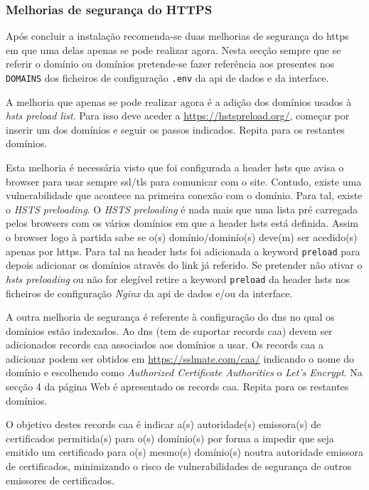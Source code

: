 \subsubsection{Melhorias de segurança do HTTPS}
Após concluir a instalação recomenda-se duas melhorias de segurança do \acrshort{https} em que uma delas apenas se pode realizar agora. Nesta secção sempre que se referir o domínio ou domínios pretende-se fazer referência aos presentes nos \texttt{DOMAINS} dos ficheiros de configuração \texttt{.env} da \acrshort{api} de dados e da interface.

A melhoria que apenas se pode realizar agora é a adição dos domínios usados à \textit{\acrshort{hsts} preload list}. Para isso deve aceder a \url{https://hstspreload.org/}, começar por inserir um dos domínios e seguir os passos indicados. Repita para os restantes domínios. 

Esta melhoria é necessária visto que foi configurada a header \acrshort{hsts} que avisa o browser para usar sempre \acrshort{ssl}/\acrshort{tls} para comunicar com o site. Contudo, existe uma vulnerabilidade que acontece na primeira conexão com o domínio. Para tal, existe o \textit{HSTS preloading}. O \textit{HSTS preloading} é nada mais que uma lista pré carregada pelos browsers com os vários domínios em que a header \acrshort{hsts} está definida. Assim o browser logo à partida sabe se o(s) domínio/dominío(s) deve(m) ser acedido(s) apenas por \acrshort{https}. Para tal na header \acrshort{hsts} foi adicionada a keyword \texttt{preload} para depois adicionar os domínios através do link já referido. Se pretender não ativar o \textit{\acrshort{hsts} preloading} ou não for elegível retire a keyword \texttt{preload} da header \acrshort{hsts} nos ficheiros de configuração \textit{Nginx} da \acrshort{api} de dados e/ou da interface.

A outra melhoria de segurança é referente à configuração do \acrshort{dns} no qual os domínios estão indexados. Ao \acrshort{dns} (tem de suportar records \acrshort{caa}) devem ser adicionados records \acrshort{caa} associados aos domínios a usar. Os records \acrshort{caa} a adicionar podem ser obtidos em \url{https://sslmate.com/caa/} indicando o nome do domínio e escolhendo como \textit{Authorized Certificate Authorities} o \textit{Let's Encrypt}. Na secção 4 da página Web é apresentado os records \acrshort{caa}. Repita para os restantes domínios. 

O objetivo destes records \acrshort{caa} é indicar a(s) autoridade(s) emissora(s) de certificados permitida(s) para o(s) domínio(s) por forma a impedir que seja emitido um certificado para o(s) mesmo(s) domínio(s) noutra autoridade emissora de certificados, minimizando o risco de vulnerabilidades de segurança de outros emissores de certificados.

